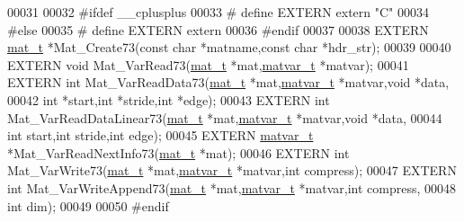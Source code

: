 \begin{DoxyCode}
00031 
00032 \textcolor{preprocessor}{#ifdef \_\_cplusplus}
00033 \textcolor{preprocessor}{#   define EXTERN extern "C"}
00034 \textcolor{preprocessor}{#else}
00035 \textcolor{preprocessor}{#   define EXTERN extern}
00036 \textcolor{preprocessor}{#endif}
00037 
00038 EXTERN \hyperlink{struct__mat__t}{mat\_t}    *Mat\_Create73(\textcolor{keyword}{const} \textcolor{keywordtype}{char} *matname,\textcolor{keyword}{const} \textcolor{keywordtype}{char} *hdr\_str);
00039 
00040 EXTERN \textcolor{keywordtype}{void}      Mat\_VarRead73(\hyperlink{struct__mat__t}{mat\_t} *mat,\hyperlink{group___m_a_t_structmatvar__t}{matvar\_t} *matvar);
00041 EXTERN \textcolor{keywordtype}{int}       Mat\_VarReadData73(\hyperlink{struct__mat__t}{mat\_t} *mat,\hyperlink{group___m_a_t_structmatvar__t}{matvar\_t} *matvar,\textcolor{keywordtype}{void} *data,
00042                      \textcolor{keywordtype}{int} *start,\textcolor{keywordtype}{int} *stride,\textcolor{keywordtype}{int} *edge);
00043 EXTERN \textcolor{keywordtype}{int}       Mat\_VarReadDataLinear73(\hyperlink{struct__mat__t}{mat\_t} *mat,\hyperlink{group___m_a_t_structmatvar__t}{matvar\_t} *matvar,\textcolor{keywordtype}{void} *data,
00044                      \textcolor{keywordtype}{int} start,\textcolor{keywordtype}{int} stride,\textcolor{keywordtype}{int} edge);
00045 EXTERN \hyperlink{group___m_a_t_structmatvar__t}{matvar\_t} *Mat\_VarReadNextInfo73(\hyperlink{struct__mat__t}{mat\_t} *mat);
00046 EXTERN \textcolor{keywordtype}{int}       Mat\_VarWrite73(\hyperlink{struct__mat__t}{mat\_t} *mat,\hyperlink{group___m_a_t_structmatvar__t}{matvar\_t} *matvar,\textcolor{keywordtype}{int} compress);
00047 EXTERN \textcolor{keywordtype}{int}       Mat\_VarWriteAppend73(\hyperlink{struct__mat__t}{mat\_t} *mat,\hyperlink{group___m_a_t_structmatvar__t}{matvar\_t} *matvar,\textcolor{keywordtype}{int} compress,
00048                      \textcolor{keywordtype}{int} dim);
00049 
00050 \textcolor{preprocessor}{#endif}
\end{DoxyCode}
